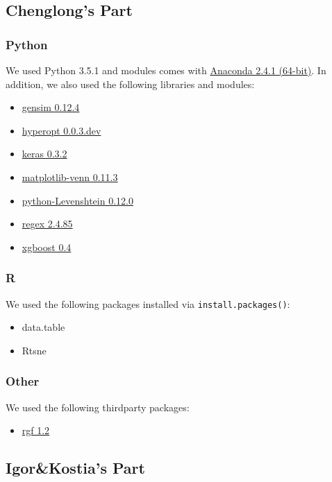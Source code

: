 \documentclass[12pt]{article}
\begin{document}
\begin{appendices}
\subsection{Chenglong's Part}
\label{subsec:Dependencies_Chenglong}
\subsubsection{Python}
We used Python 3.5.1 and modules comes with \href{https://repo.continuum.io/archive/Anaconda3-2.4.1-Linux-x86\_64.sh}{Anaconda 2.4.1 (64-bit)}. In addition, we also used the following libraries and modules:
\begin{itemize}
\item \href{https://github.com/piskvorky/gensim/archive/0.12.4.tar.gz}{gensim 0.12.4}
\item \href{https://github.com/hyperopt/hyperopt}{hyperopt 0.0.3.dev}
\item \href{https://github.com/fchollet/keras/archive/0.3.2.tar.gz}{keras 0.3.2}
\item \href{https://pypi.python.org/pypi/matplotlib-venn}{matplotlib-venn 0.11.3}
\item \href{https://pypi.python.org/pypi/python-Levenshtein/0.12.0}{python-Levenshtein 0.12.0}
\item \href{https://pypi.python.org/pypi/regex}{regex 2.4.85}
\item \href{https://github.com/dmlc/xgboost/archive/v0.40.tar.gz}{xgboost 0.4}
\end{itemize}
\subsubsection{R}
We used the following packages installed via \texttt{install.packages()}:
\begin{itemize}
\item data.table
\item Rtsne
\end{itemize}
\subsubsection{Other}
We used the following thirdparty packages:
\begin{itemize}
\item \href{http://stat.rutgers.edu/home/tzhang/software/rgf/rgf1.2.zip}{rgf 1.2}
\end{itemize}



\subsection{Igor\&Kostia's Part}
\label{subsec:Dependencies_IandK}

\end{appendices}
\end{document}
